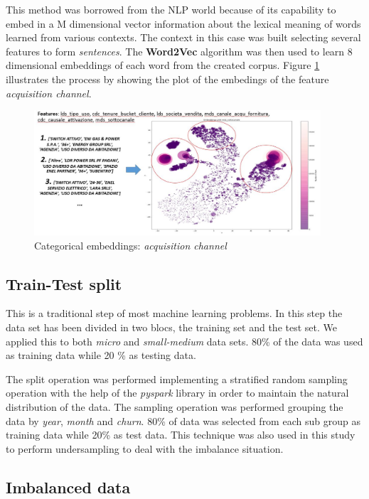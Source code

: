 \documentclass[LaM,binding=0.6cm, english]{sapthesis}
\begin{document}
This method was borrowed from the NLP world because of its capability to embed in a M dimensional vector information about the lexical meaning of words learned from various contexts. The context in this case was built selecting several features to form \textit{sentences}. The \textbf{Word2Vec} algorithm was then used to learn 8 dimensional embeddings of each word from the created corpus. Figure \ref{fig:categorical-embeddings} illustrates the process by showing the plot of the embedings of the feature \textit{acquisition channel}.

\begin{figure}[!ht]
    \includegraphics[width=0.95\textwidth]{images/categorical_embeddings.jpg}
    \centering
    \caption{Categorical embeddings: \textit{acquisition channel}}
    \label{fig:categorical-embeddings}
\end{figure}

\subsection{Train-Test split}

This is a traditional step of most machine learning problems. In this step the data set has been divided in two blocs, the training set and the test set. We applied this to both \textit{micro} and \textit{small-medium} data sets. 80\% of the data was used as training data while 20 \% as testing data.

The split operation was performed implementing a stratified random sampling operation with the help of the \textit{pyspark} library in order to maintain the natural distribution of the data. The sampling operation was performed grouping the data by \textit{year}, \textit{month} and \textit{churn}. 80\% of data was selected from each sub group as training data while 20\% as test data. This technique was also used in this study to perform undersampling to deal with the imbalance situation.

\subsection{Imbalanced data}
\end{document}
